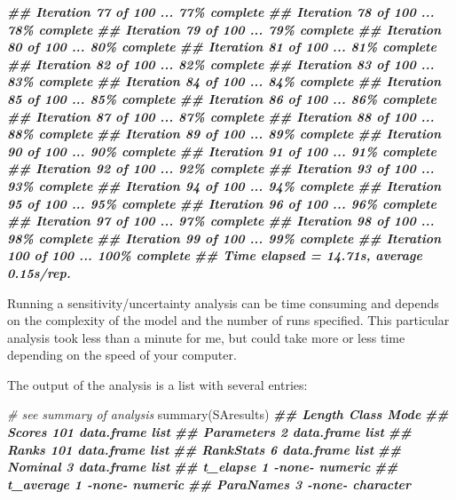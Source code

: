 \documentclass[
]{book}
\newenvironment{Shaded}{\begin{snugshade}}{\end{snugshade}}
\newcommand{\CommentTok}[1]{\textcolor[rgb]{0.56,0.35,0.01}{\textit{#1}}}
\newcommand{\DocumentationTok}[1]{\textcolor[rgb]{0.56,0.35,0.01}{\textbf{\textit{#1}}}}
\newcommand{\FunctionTok}[1]{\textcolor[rgb]{0.00,0.00,0.00}{#1}}
\newcommand{\NormalTok}[1]{#1}
\begin{document}
\begin{Shaded}
\begin{Highlighting}[]
\DocumentationTok{\#\# Iteration 77 of 100 ... 77\% complete}
\DocumentationTok{\#\# Iteration 78 of 100 ... 78\% complete}
\DocumentationTok{\#\# Iteration 79 of 100 ... 79\% complete}
\DocumentationTok{\#\# Iteration 80 of 100 ... 80\% complete}
\DocumentationTok{\#\# Iteration 81 of 100 ... 81\% complete}
\DocumentationTok{\#\# Iteration 82 of 100 ... 82\% complete}
\DocumentationTok{\#\# Iteration 83 of 100 ... 83\% complete}
\DocumentationTok{\#\# Iteration 84 of 100 ... 84\% complete}
\DocumentationTok{\#\# Iteration 85 of 100 ... 85\% complete}
\DocumentationTok{\#\# Iteration 86 of 100 ... 86\% complete}
\DocumentationTok{\#\# Iteration 87 of 100 ... 87\% complete}
\DocumentationTok{\#\# Iteration 88 of 100 ... 88\% complete}
\DocumentationTok{\#\# Iteration 89 of 100 ... 89\% complete}
\DocumentationTok{\#\# Iteration 90 of 100 ... 90\% complete}
\DocumentationTok{\#\# Iteration 91 of 100 ... 91\% complete}
\DocumentationTok{\#\# Iteration 92 of 100 ... 92\% complete}
\DocumentationTok{\#\# Iteration 93 of 100 ... 93\% complete}
\DocumentationTok{\#\# Iteration 94 of 100 ... 94\% complete}
\DocumentationTok{\#\# Iteration 95 of 100 ... 95\% complete}
\DocumentationTok{\#\# Iteration 96 of 100 ... 96\% complete}
\DocumentationTok{\#\# Iteration 97 of 100 ... 97\% complete}
\DocumentationTok{\#\# Iteration 98 of 100 ... 98\% complete}
\DocumentationTok{\#\# Iteration 99 of 100 ... 99\% complete}
\DocumentationTok{\#\# Iteration 100 of 100 ... 100\% complete}
\DocumentationTok{\#\# Time elapsed = 14.71s, average 0.15s/rep.}
\end{Highlighting}
\end{Shaded}

Running a sensitivity/uncertainty analysis can be time consuming and depends on the complexity of the model and the number of runs specified. This particular analysis took less than a minute for me, but could take more or less time depending on the speed of your computer.

The output of the analysis is a list with several entries:

\begin{Shaded}
\begin{Highlighting}[]
\CommentTok{\# see summary of analysis}
\FunctionTok{summary}\NormalTok{(SAresults)}
\DocumentationTok{\#\#            Length Class      Mode     }
\DocumentationTok{\#\# Scores     101    data.frame list     }
\DocumentationTok{\#\# Parameters   2    data.frame list     }
\DocumentationTok{\#\# Ranks      101    data.frame list     }
\DocumentationTok{\#\# RankStats    6    data.frame list     }
\DocumentationTok{\#\# Nominal      3    data.frame list     }
\DocumentationTok{\#\# t\_elapse     1    {-}none{-}     numeric  }
\DocumentationTok{\#\# t\_average    1    {-}none{-}     numeric  }
\DocumentationTok{\#\# ParaNames    3    {-}none{-}     character}
\end{Highlighting}
\end{Shaded}
\end{document}

